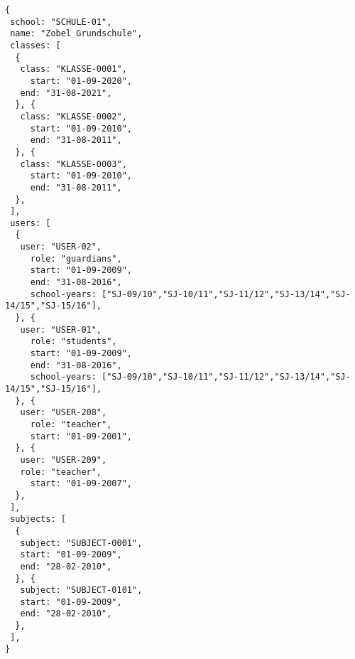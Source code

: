 
\begin{lstlisting}[caption={Schulen-Datenmodell Beispiel 1},frame=tlrb]
{
 school: "SCHULE-01",
 name: "Zobel Grundschule",
 classes: [ 
  {
   class: "KLASSE-0001",
	 start: "01-09-2020",
   end: "31-08-2021",
  }, {
   class: "KLASSE-0002",
	 start: "01-09-2010",
	 end: "31-08-2011",
  }, {
   class: "KLASSE-0003", 
	 start: "01-09-2010",
	 end: "31-08-2011",
  },
 ],
 users: [
  {
   user: "USER-02",
 	 role: "guardians",
	 start: "01-09-2009",
	 end: "31-08-2016",
	 school-years: ["SJ-09/10","SJ-10/11","SJ-11/12","SJ-13/14","SJ-14/15","SJ-15/16"],
  }, {
   user: "USER-01",
	 role: "students",
	 start: "01-09-2009",
	 end: "31-08-2016",
	 school-years: ["SJ-09/10","SJ-10/11","SJ-11/12","SJ-13/14","SJ-14/15","SJ-15/16"],
  }, {
   user: "USER-208",
	 role: "teacher",
	 start: "01-09-2001",
  }, {
   user: "USER-209",
   role: "teacher",
 	 start: "01-09-2007",
  },
 ],
 subjects: [
  {
   subject: "SUBJECT-0001",
   start: "01-09-2009",
   end: "28-02-2010",
  }, {
   subject: "SUBJECT-0101",
   start: "01-09-2009",
   end: "28-02-2010",
  }, 
 ],
}
\end{lstlisting}